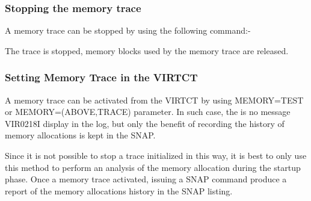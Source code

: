 \documentclass[letterpaper,10pt,english]{sphinxmanual}
\begin{document}
\begin{sphinxVerbatim}[commandchars=\\\{\}]
 
          
   
   
   
          
\end{sphinxVerbatim}


\subsubsection{Stopping the memory trace}
\label{\detokenize{audit_operations_ and_performance:stopping-the-memory-trace}}
A memory trace can be stopped by using the following command:-

\begin{sphinxVerbatim}[commandchars=\\\{\}]
\end{sphinxVerbatim}

The trace is stopped, memory blocks used by the memory trace are released.


\subsubsection{Setting Memory Trace in the VIRTCT}
\label{\detokenize{audit_operations_ and_performance:setting-memory-trace-in-the-virtct}}
A memory trace can be activated from the VIRTCT by using MEMORY=TEST or MEMORY=(ABOVE,TRACE) parameter. In such case, the is no message VIR0218I display in the log, but only the benefit of recording the history of memory allocations is kept in the SNAP.

Since it is not possible to stop a trace initialized in this way, it is best to only use this method to perform an analysis of the memory allocation during the startup phase.
Once a memory trace activated, issuing a SNAP command produce a report of the memory allocations history in the SNAP listing.
\end{document}
